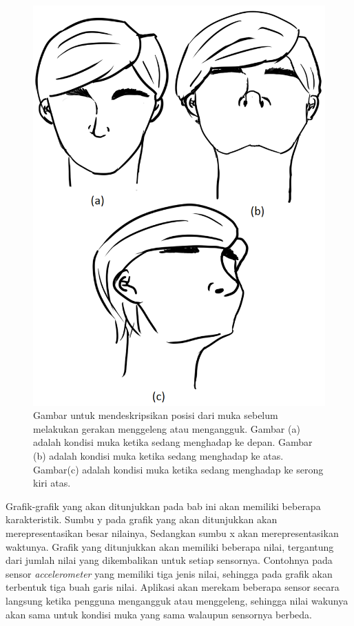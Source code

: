 \begin{figure}[htbp]
\centering
\includegraphics[scale=0.4]{Gambar/posisi-muka.png}
\caption{Gambar untuk mendeskripsikan posisi dari muka sebelum melakukan gerakan menggeleng atau mengangguk. Gambar (a) adalah kondisi muka ketika sedang menghadap ke depan. Gambar (b) adalah kondisi muka ketika sedang menghadap ke atas. Gambar(c) adalah kondisi muka ketika sedang menghadap ke serong kiri atas.}
\label{fig:posisi-muka}
\end{figure}

Grafik-grafik yang akan ditunjukkan pada bab ini akan memiliki beberapa karakteristik. Sumbu y pada grafik yang akan ditunjukkan akan merepresentasikan besar nilainya, Sedangkan sumbu x akan merepresentasikan waktunya. Grafik yang ditunjukkan akan memiliki beberapa nilai, tergantung dari jumlah nilai yang dikembalikan untuk setiap sensornya. Contohnya pada sensor \textit{accelerometer} yang memiliki tiga jenis nilai, sehingga pada grafik akan terbentuk tiga buah garis nilai. Aplikasi akan merekam beberapa sensor secara langsung ketika pengguna mengangguk atau menggeleng, sehingga nilai wakunya akan sama untuk kondisi muka yang sama walaupun sensornya berbeda.

